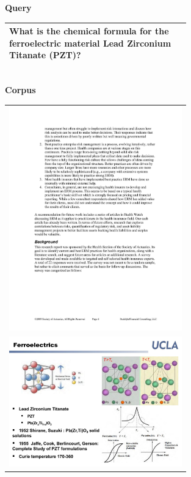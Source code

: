 \begin{figure}[h]
\centering
\textbf{Query}

\begin{tabular}{|p{0.7\linewidth}|}
\hline
What is the chemical formula for the ferroelectric material Lead Zirconium Titanate (PZT)? \\
\hline
\end{tabular}
\\
\textbf{Corpus}
\\
\begin{tabular}{|>{\centering\arraybackslash} p{0.7\linewidth}|}
\hline
\includegraphics[width=0.8\linewidth,frame]{figures/examples_assests/document_understanding/corpus_1.pdf} \\
\includegraphics[width=0.8\linewidth,frame]{figures/examples_assests/document_understanding/answer.pdf} \\

\end{tabular}
\end{figure}
